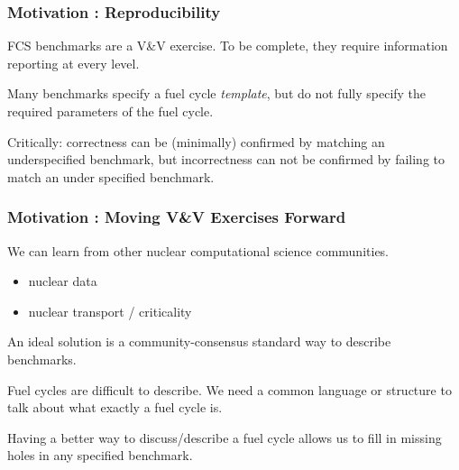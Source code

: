 \begin{frame}[ctb!]
  \frametitle{Motivation : Reproducibility} 

  FCS benchmarks are a V\&V exercise. To be complete, they require information
  reporting at every level.

  \vspace{0.4cm}

  Many benchmarks specify a fuel cycle \textit{template}, but do not fully 
  specify the required parameters of the fuel cycle.

  \vspace{0.4cm}

  Critically: correctness can be (minimally) confirmed by matching an
  underspecified benchmark, but incorrectness can not be confirmed by failing to
  match an under specified benchmark.
\end{frame}

\begin{frame}[ctb!]
  \frametitle{Motivation : Moving V\&V Exercises Forward}
  We can learn from other nuclear computational science communities.
  \begin{itemize}
    \item nuclear data \cite{mattoon_generalized_2012}
    \item nuclear transport / criticality
  \end{itemize}

  \vspace{0.4cm}

  An ideal solution is a community-consensus standard way to describe benchmarks.

  \vspace{0.4cm}

  Fuel cycles are difficult to describe. We need a common language or structure
  to talk about what exactly a fuel cycle is.

  \vspace{0.4cm}

  Having a better way to discuss/describe a fuel cycle allows us to fill in
  missing holes in any specified benchmark.
\end{frame}

